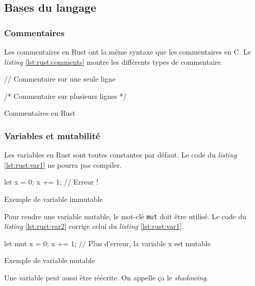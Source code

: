 \subsection{Bases du langage}
\subsubsection{Commentaires}
Les commentaires en Rust ont la même syntaxe que les commentaires en C. Le \textit{listing}
\ref{lst:rust:comments} montre les différents types de commentaire.

\begin{code}
\begin{rustcode}
// Commentaire sur une seule ligne

/* Commentaire sur
   plusieurs lignes */
\end{rustcode}
\caption{Commentaires en Rust}
\label{lst:rust:comments}
\end{code} \bigbreak


\subsubsection{Variables et mutabilité}
Les variables en Rust sont toutes constantes par défaut. Le code du \textit{listing}
\ref{lst:rust:var1} ne pourra pas compiler.

\begin{code}
\begin{rustcode}
let x = 0;
x += 1; // Erreur !
\end{rustcode}
\caption{Exemple de variable immutable}
\label{lst:rust:var1}
\end{code} \bigbreak

Pour rendre une variable mutable, le mot-clé \texttt{mut} doit être utilisé.
Le code du \textit{listing} \ref{lst:rust:var2} corrige celui du \textit{listing}
\ref{lst:rust:var1}.

\begin{code}
\begin{rustcode}
let mut x = 0;
x += 1; // Plus d'erreur, la variable x est mutable
\end{rustcode}
\caption{Exemple de variable mutable}
\label{lst:rust:var2}
\end{code} \bigbreak

Une variable peut aussi être réécrite. On appelle ça le \textit{shadowing}.

